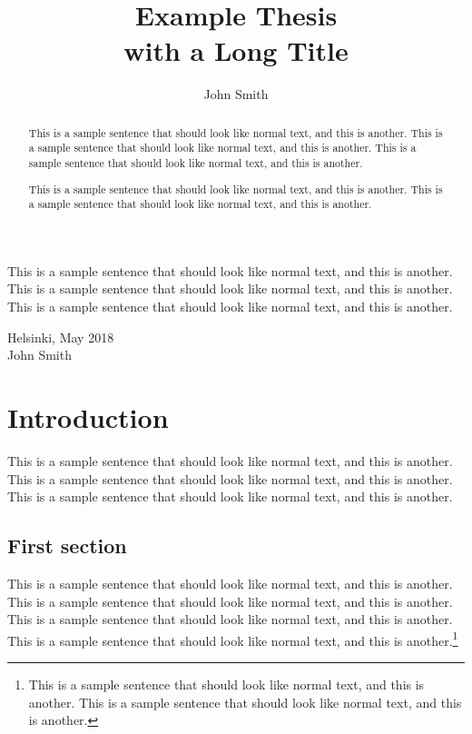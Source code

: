 \documentclass[officiallayout]{tktla}
\title{Example Thesis \\ with a Long Title}
\author{John Smith}
\begin{document}
\frontmatter

\maketitle

\begin{abstract}
  This is a sample sentence that should look like normal text, and
  this is another. This is a sample sentence that should look like
  normal text, and this is another. This is a sample sentence that
  should look like normal text, and this is another.

  This is a sample sentence that should look like normal text, and
  this is another. This is a sample sentence that should look like
  normal text, and this is another.
\end{abstract}

\begin{acknowledgements}
  This is a sample sentence that should look like normal text, and
  this is another. This is a sample sentence that should look like
  normal text, and this is another. This is a sample sentence that
  should look like normal text, and this is another.

  \begin{flushright}
  Helsinki, May 2018\\
  John Smith
  \end{flushright}
\end{acknowledgements}

\tableofcontents

\mainmatter


\chapter{Introduction}

This is a sample sentence that should look like normal text, and this
is another. This is a sample sentence that should look like normal
text, and this is another. This is a sample sentence that should look
like normal text, and this is another.

\section{First section}

This is a sample sentence that should look like normal text, and this
is another. This is a sample sentence that should look like normal
text, and this is another. This is a sample sentence that should look
like normal text, and this is another. This is a sample sentence that
should look like normal text, and this is another.\footnote{This is a
sample sentence that should look like normal text, and this is
another. This is a sample sentence that should look like normal text,
and this is another.}
\end{document}

